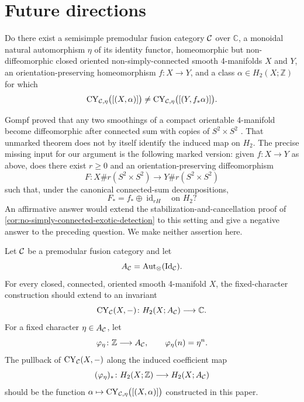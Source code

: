 \section{Future directions}
\label{sec:future-directions}

\begin{question}
\label{conj:non-simply-connected-detection}
Do there exist a semisimple premodular fusion category $\mathcal{C}$ over $\mathbb C$,
a monoidal natural automorphism $\eta$ of its identity functor, homeomorphic
but non-diffeomorphic closed oriented non-simply-connected smooth
4-manifolds $X$ and $Y$, an orientation-preserving homeomorphism
$f\colon X\to Y$, and a class $\alpha\in H_2(X;\mathbb Z)$ for which
\[
  \operatorname{CY}_{\mathcal{C},\eta}\bigl([(X,\alpha)]\bigr)
  \ne\operatorname{CY}_{\mathcal{C},\eta}\bigl([(Y,f_*\alpha)]\bigr).
\]
\end{question}

Gompf proved that any two smoothings of a compact orientable 4-manifold
become diffeomorphic after connected sum with copies of $S^2\times S^2$
\cite{Gompf1984}.  That unmarked theorem does not by itself identify the
induced map on $H_2$.  The precise missing input for our argument is the
following marked version: given $f\colon X\to Y$ as above, does there exist
$r\geq0$ and an orientation-preserving diffeomorphism
\[
 F\colon X\#r(S^2\times S^2)\longrightarrow
          Y\#r(S^2\times S^2)
\]
such that, under the canonical connected-sum decompositions,
\[
 F_*=f_*\oplus\operatorname{id}_{rH}
 \quad\text{on }H_2?
\]
An affirmative answer would extend the stabilization-and-cancellation proof
of \cref{cor:no-simply-connected-exotic-detection} to this setting and give a
negative answer to the preceding question.  We make neither assertion here.

\begin{conjecture}
\label{conj:full-coefficient-extension}
Let \(\mathcal{C}\) be a premodular fusion category and let
\[
  A_{\mathcal{C}}=\operatorname{Aut}_{\otimes}(\operatorname{Id}_{\mathcal{C}}).
\]
For every closed, connected, oriented smooth 4-manifold \(X\), the
fixed-character construction should extend to an invariant
\[
  \operatorname{CY}_{\mathcal{C}}(X,-)\colon H_2(X;A_{\mathcal{C}})\longrightarrow\mathbb C.
\]
For a fixed character $\eta\in A_{\mathcal{C}}$, let
\[
  \varphi_\eta\colon\mathbb Z\longrightarrow A_{\mathcal{C}},
  \qquad \varphi_\eta(n)=\eta^n.
\]
The pullback of $\operatorname{CY}_{\mathcal{C}}(X,-)$ along the induced coefficient map
\[
  (\varphi_\eta)_*\colon H_2(X;\mathbb Z)\longrightarrow H_2(X;A_{\mathcal{C}})
\]
should be the function
$\alpha\mapsto\operatorname{CY}_{\mathcal{C},\eta}\bigl([(X,\alpha)]\bigr)$ constructed in this
paper.
\end{conjecture}

